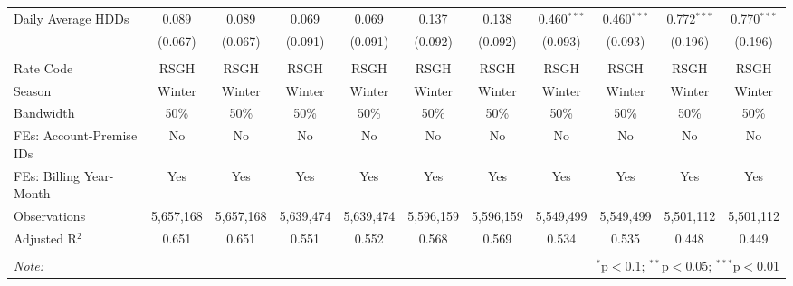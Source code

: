 \begin{table}[!htbp]
\begin{adjustbox}{scale = 0.75}
\begin{tabular}{@{\extracolsep{5pt}}lcccccccccc}
 Daily Average HDDs & 0.089 & 0.089 & 0.069 & 0.069 & 0.137 & 0.138 & 0.460$^{***}$ & 0.460$^{***}$ & 0.772$^{***}$ & 0.770$^{***}$ \\ 
  & (0.067) & (0.067) & (0.091) & (0.091) & (0.092) & (0.092) & (0.093) & (0.093) & (0.196) & (0.196) \\ 
\hline \\[-1.8ex] 
Rate Code & RSGH & RSGH & RSGH & RSGH & RSGH & RSGH & RSGH & RSGH & RSGH & RSGH \\ 
Season & Winter & Winter & Winter & Winter & Winter & Winter & Winter & Winter & Winter & Winter \\ 
Bandwidth & 50\% & 50\% & 50\% & 50\% & 50\% & 50\% & 50\% & 50\% & 50\% & 50\% \\ 
FEs: Account-Premise IDs & No & No & No & No & No & No & No & No & No & No \\ 
FEs: Billing Year-Month & Yes & Yes & Yes & Yes & Yes & Yes & Yes & Yes & Yes & Yes \\ 
Observations & 5,657,168 & 5,657,168 & 5,639,474 & 5,639,474 & 5,596,159 & 5,596,159 & 5,549,499 & 5,549,499 & 5,501,112 & 5,501,112 \\ 
Adjusted R$^{2}$ & 0.651 & 0.651 & 0.551 & 0.552 & 0.568 & 0.569 & 0.534 & 0.535 & 0.448 & 0.449 \\ 
\hline 
\hline \\[-1.8ex] 
\textit{Note:}  & \multicolumn{10}{r}{$^{*}$p$<$0.1; $^{**}$p$<$0.05; $^{***}$p$<$0.01} \\ 
\end{tabular} 
\end{adjustbox}
\end{table} 
